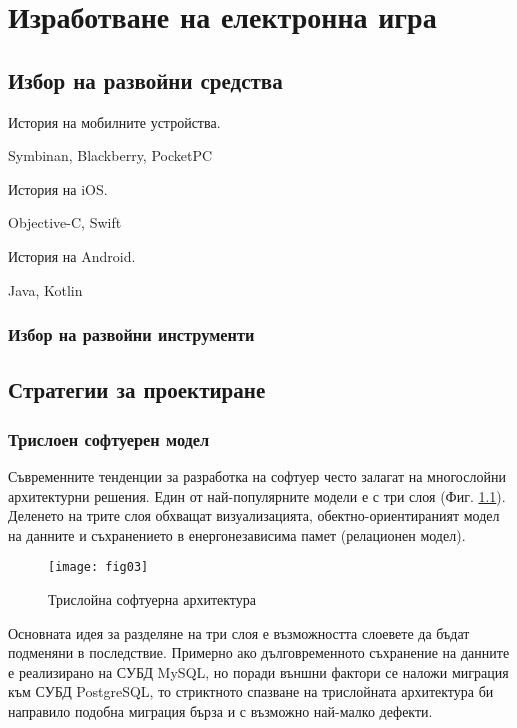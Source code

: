 ﻿\newpage
\chapter{Изработване на електронна игра}
\label{chapter02}

\section{Избор на развойни средства}

История на мобилните устройства.

Symbinan, Blackberry, PocketPC

История на iOS.

Objective-C, Swift

История на Android.

Java, Kotlin

\subsection{Избор на развойни инструменти}

\section{Стратегии за проектиране}

\subsection{Трислоен софтуерен модел}

Съвременните тенденции за разработка на софтуер често залагат на многослойни архитектурни решения. Един от най-популярните модели е с три слоя (Фиг. \ref{figure03}). Деленето на трите слоя обхващат визуализацията, обектно-ориентираният модел на данните и съхранението в енергонезависима памет (релационен модел). 

\begin{figure}[h!]
 \centering
 \texttt{[image: fig03]}
 \caption{Трислойна софтуерна архитектура}
\label{figure03}
\end{figure}
\FloatBarrier

Основната идея за разделяне на три слоя е възможността слоевете да бъдат подменяни в последствие. Примерно ако дълговременното съхранение на данните е реализирано на СУБД MySQL, но поради външни фактори се наложи миграция към СУБД PostgreSQL, то стриктното спазване на трислойната архитектура би направило подобна миграция бърза и с възможно най-малко дефекти. 

